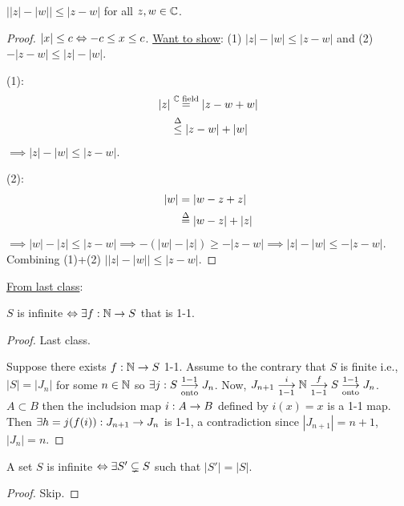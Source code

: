 \documentclass[]{article}
\begin{document}
\begin{example}
	[HW3.4] $\left| |z|-|w|\right| \leq |z-w|$ for all $z,w\in\mathbb{C}$.
	\begin{proof}
		$|x|\leq c \Leftrightarrow -c\leq x \leq c$.
		\ul{Want to show}: (1) $|z|-|w| \leq |z-w|$ and (2) $-|z-w|\leq |z|-|w|$.

		(1): 
		\begin{align*}
			|z| &\overset{\mathbb{C}\text{ field}}{=} |z-w+w| \\
				&\overset{\Delta}{\leq} |z-w| + |w|		
		\end{align*}
		$\implies |z|-|w|\leq |z-w|$.

		(2):
		\begin{align*}
			|w| &= |w-z+z| \\
				&\overset{\Delta}{=} |w-z|+|z|
		\end{align*}
		$\implies |w|-|z|\leq |z-w| \implies -(|w|-|z|) \geq -|z-w| \implies |z|-|w| \leq -|z-w|$.
		Combining (1)+(2) $\left||z|-|w|\right| \leq |z-w|$.
	\end{proof}
\end{example}

\ul{From last class}:
\begin{proposition}
	$S$ is infinite $\Leftrightarrow \exists f:\mathbb{N} \rightarrow S$ that is 1-1.
\end{proposition}
\begin{proof}
	\say{$\implies$} Last class.

	\say{$\Lla$} Suppose there exists $f:\mathbb{N} \rightarrow S$ 1-1.
	Assume to the contrary that $S$ is finite i.e., $|S| = |J_n|$ for some $n\in\mathbb{N}$ so $\exists j:S\overset{1-1}{\underset{\text{onto}}{\longrightarrow}} J_n$.
	Now, $J_{n+1} \overset{i}{\underset{1-1}{\longrightarrow}} \mathbb{N} \overset{f}{\underset{1-1}{\longrightarrow}} S \overset{1-1}{\underset{\text{onto}}{\longrightarrow}} J_n$.
	$A\subset B$ then the includsion map $i:A\rightarrow B$ defined by $i(x) = x$ is a 1-1 map.
	Then $\exists h = j(f(i)): J_{n+1} \rightarrow J_n$ is 1-1, a contradiction since $|J_{n+1}| = n+1$, $|J_n| = n$.
\end{proof}
\begin{proposition}
	A set $S$ is infinite $\Leftrightarrow \exists S'\subsetneq S$ such that $|S'| = |S|$.
\end{proposition}
\begin{proof}
	Skip.
\end{proof}
\end{document}
